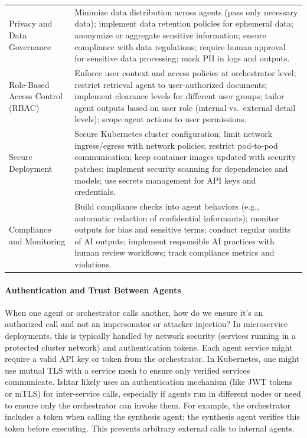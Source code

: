 \begin{table}[t]
\begin{tabularx}{\linewidth}{@{}p{3.2cm}X@{}}
Privacy and Data Governance & Minimize data distribution across agents (pass only necessary data); implement data retention policies for ephemeral data; anonymize or aggregate sensitive information; ensure compliance with data regulations; require human approval for sensitive data processing; mask PII in logs and outputs. \\
Role-Based Access Control (RBAC) & Enforce user context and access policies at orchestrator level; restrict retrieval agent to user-authorized documents; implement clearance levels for different user groups; tailor agent outputs based on user role (internal vs.\ external detail levels); scope agent actions to user permissions. \\
Secure Deployment & Secure Kubernetes cluster configuration; limit network ingress/egress with network policies; restrict pod-to-pod communication; keep container images updated with security patches; implement security scanning for dependencies and models; use secrets management for API keys and credentials. \\
Compliance and Monitoring & Build compliance checks into agent behaviors (e.g., automatic redaction of confidential informants); monitor outputs for bias and sensitive terms; conduct regular audits of AI outputs; implement responsible AI practices with human review workflows; track compliance metrics and violations. \\
\bottomrule
\end{tabularx}
\end{table}

\FloatBarrier
\paragraph*{Authentication and Trust Between Agents}
When one agent or orchestrator calls another, how do we ensure it's an authorized call and not an impersonator or attacker injection? In microservice deployments, this is typically handled by network security (services running in a protected cluster network) and authentication tokens. Each agent service might require a valid API key or token from the orchestrator. In Kubernetes, one might use mutual TLS with a service mesh to ensure only verified services communicate. Ishtar likely uses an authentication mechanism (like JWT tokens or mTLS) for inter-service calls, especially if agents run in different nodes or need to ensure only the orchestrator can invoke them. For example, the orchestrator includes a token when calling the synthesis agent; the synthesis agent verifies this token before executing. This prevents arbitrary external calls to internal agents.

